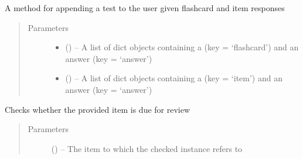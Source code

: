\documentclass[letterpaper,10pt,english]{sphinxmanual}
\begin{document}
\begin{fulllineitems}
\begin{fulllineitems}
\begin{quote}
\begin{description}
\begin{itemize}
\end{itemize}

\end{description}\end{quote}

\end{fulllineitems}


\begin{fulllineitems}
\label{\detokenize{user:user.User.append_test}}
A method for appending a test to the user given flashcard and item responses
\begin{quote}\begin{description}
\item[{Parameters}] \leavevmode\begin{itemize}
\item {} 
 (\href{https://docs.python.org/2/library/stdtypes.html\#dict}{}) -- A list of dict objects containing a  (key = `flashcard') and an answer (key = `answer')

\item {} 
 (\href{https://docs.python.org/2/library/stdtypes.html\#dict}{}) -- A list of dict objects containing a  (key = `item') and an answer (key = `answer')

\end{itemize}

\end{description}\end{quote}

\end{fulllineitems}


\begin{fulllineitems}
\label{\detokenize{user:user.User.check_due}}
Checks whether the provided item is due for review
\begin{quote}\begin{description}
\item[{Parameters}] \leavevmode
{} ({\hyperref[\detokenize{edge:edge.Edge}]{}}) -- The item to which the checked instance refers to


\end{description}
\end{quote}
\end{fulllineitems}
\end{fulllineitems}
\end{document}

